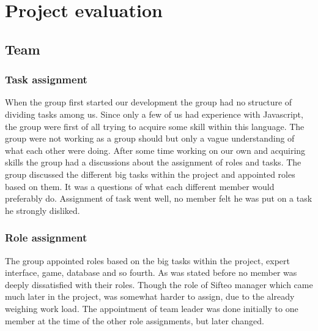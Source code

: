 \chapter{Project evaluation}

\section{Team}

\subsection*{Task assignment}
When the group first started our development the group had no structure of dividing tasks among us. Since only a few of us had experience with Javascript, the group were first of all trying to acquire some skill within this language. The group were not working as a group should but only a vague understanding of what each other were doing. After some time working on our own and acquiring skills the group had a discussions about the assignment of roles and tasks. The group discussed the different big tasks within the project and appointed roles based on them. It was a questions of what each different member would preferably do. Assignment of task went well, no member felt he was put on a task he strongly disliked.

\subsection*{Role assignment}

The group appointed roles based on the big tasks within the project, expert interface, game, database and so fourth. As was stated before no member was deeply dissatisfied with their roles. Though the role of Sifteo manager which came much later in the project, was somewhat harder to assign, due to the already weighing work load. The appointment of team leader was done initially to one member at the time of the other role assignments, but later changed. 

